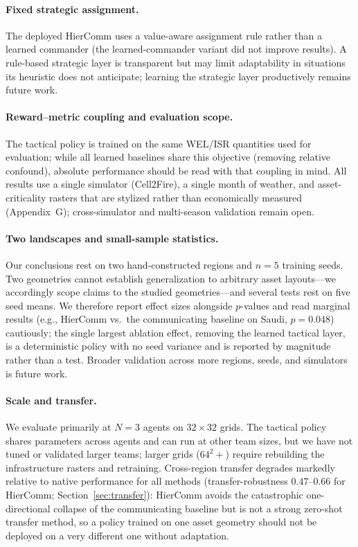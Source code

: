 \documentclass[letterpaper]{article}
\begin{document}
\paragraph{Fixed strategic assignment.}
The deployed HierComm uses a value-aware assignment rule rather than a learned commander (the learned-commander variant did not improve results). A rule-based strategic layer is transparent but may limit adaptability in situations its heuristic does not anticipate; learning the strategic layer productively remains future work.

\paragraph{Reward--metric coupling and evaluation scope.}
The tactical policy is trained on the same WEL/ISR quantities used for evaluation; while all learned baselines share this objective (removing relative confound), absolute performance should be read with that coupling in mind. All results use a single simulator (Cell2Fire), a single month of weather, and asset-criticality rasters that are stylized rather than economically measured (Appendix~G); cross-simulator and multi-season validation remain open.

\paragraph{Two landscapes and small-sample statistics.}
Our conclusions rest on two hand-constructed regions and $n=5$ training seeds. Two geometries cannot establish generalization to arbitrary asset layouts---we accordingly scope claims to the studied geometries---and several tests rest on five seed means. We therefore report effect sizes alongside $p$-values and read marginal results (e.g., HierComm vs.\ the communicating baseline on Saudi, $p=0.048$) cautiously; the single largest ablation effect, removing the learned tactical layer, is a deterministic policy with no seed variance and is reported by magnitude rather than a test. Broader validation across more regions, seeds, and simulators is future work.

\paragraph{Scale and transfer.}
We evaluate primarily at $N=3$ agents on $32\times32$ grids. The tactical policy shares parameters across agents and can run at other team sizes, but we have not tuned or validated larger teams; larger grids ($64^2+$) require rebuilding the infrastructure rasters and retraining. Cross-region transfer degrades markedly relative to native performance for all methods (transfer-robustness $0.47$--$0.66$ for HierComm; Section~\ref{sec:transfer}): HierComm avoids the catastrophic one-directional collapse of the communicating baseline but is not a strong zero-shot transfer method, so a policy trained on one asset geometry should not be deployed on a very different one without adaptation.
\end{document}
